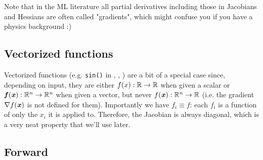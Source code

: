 \documentclass[11pt]{scrartcl}
\begin{document}
Note that in the ML literature all partial derivatives including those in
Jacobians and Hessians are often called "gradients", which might confuse you if
you have a physics background :)

\subsection{Vectorized functions}

Vectorized functions (e.g. \verb|sin()| in \numpy, \jax, \pytorch) are a
bit of a special case since, depending on input, they are either $f(x):\mathbb
R\rightarrow\mathbb R$ when given a scalar or $\bm{\mathit{f}}(\bm{\mathit{x}}):\mathbb R^n\rightarrow\mathbb R^n$
when given a vector, but never $f(\bm{\mathit{x}}): \mathbb R^n \rightarrow \mathbb R$ (i.e. the
gradient $\nabla f(\bm{\mathit{x}})$ is not defined for them). Importantly we have
$f_i\equiv f$: each $f_i$ is a function of only the $x_i$ it is applied to.
Therefore, the Jacobian is always diagonal, which is a very neat property that
we'll use later.

\subsection{Forward}
\end{document}
